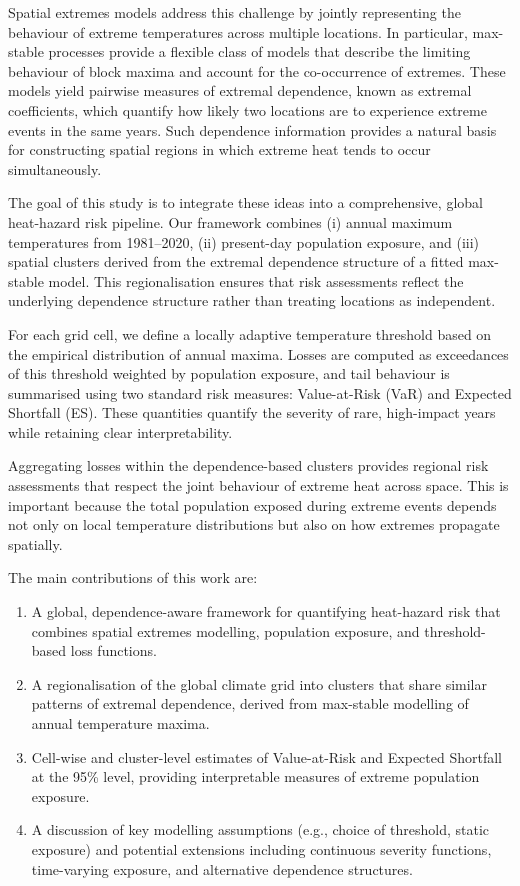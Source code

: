 \documentclass[12pt]{article}
\begin{document}
Spatial extremes models address this challenge by jointly representing the behaviour of
extreme temperatures across multiple locations. In particular, max-stable processes
provide a flexible class of models that describe the limiting behaviour of block maxima
and account for the co-occurrence of extremes. These models yield pairwise measures of
extremal dependence, known as extremal coefficients, which quantify how likely two
locations are to experience extreme events in the same years. Such dependence
information provides a natural basis for constructing spatial regions in which extreme
heat tends to occur simultaneously.

The goal of this study is to integrate these ideas into a comprehensive, global
heat-hazard risk pipeline. Our framework combines (i) annual maximum temperatures from
1981--2020, (ii) present-day population exposure, and (iii) spatial clusters derived from
the extremal dependence structure of a fitted max-stable model. This regionalisation
ensures that risk assessments reflect the underlying dependence structure rather than
treating locations as independent.

For each grid cell, we define a locally adaptive temperature threshold based on the
empirical distribution of annual maxima. Losses are computed as exceedances of this
threshold weighted by population exposure, and tail behaviour is summarised using two
standard risk measures: Value-at-Risk (VaR) and Expected Shortfall (ES). These
quantities quantify the severity of rare, high-impact years while retaining clear
interpretability.

Aggregating losses within the dependence-based clusters provides regional risk
assessments that respect the joint behaviour of extreme heat across space. This is
important because the total population exposed during extreme events depends not only on
local temperature distributions but also on how extremes propagate spatially.

The main contributions of this work are:
\begin{enumerate}
    \item A global, dependence-aware framework for quantifying heat-hazard risk that combines spatial extremes modelling, population exposure, and threshold-based loss functions.
    \item A regionalisation of the global climate grid into clusters that share similar patterns of extremal dependence, derived from max-stable modelling of annual temperature maxima.
    \item Cell-wise and cluster-level estimates of Value-at-Risk and Expected Shortfall at the 95\% level, providing interpretable measures of extreme population exposure.
    \item A discussion of key modelling assumptions (e.g., choice of threshold, static exposure) and potential extensions including continuous severity functions, time-varying exposure, and alternative dependence structures.
\end{enumerate}
\end{document}
